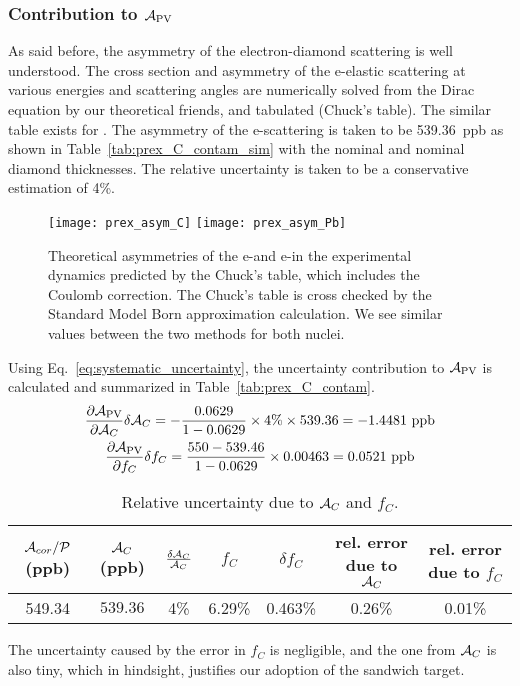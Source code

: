 \subsubsection{Contribution to $\mathcal{A}_{\text{PV}}$}
As said before, the asymmetry of the electron-diamond scattering is well understood.
The cross section and asymmetry of the e-\C elastic scattering at various energies 
and scattering angles are numerically solved from the Dirac equation by our 
theoretical friends, and tabulated (Chuck's table). The similar table exists for \Pb.
The asymmetry of the e-\C scattering is taken to be 539.36~ppb as shown in 
Table~\ref{tab:prex_C_contam_sim}
with the nominal \Pb and nominal diamond thicknesses. The relative uncertainty is taken
to be a conservative estimation of 4\%.
\begin{figure}[!h]
    \centering
    \texttt{[image: prex\_asym\_C]}
    \texttt{[image: prex\_asym\_Pb]}
    \caption{Theoretical asymmetries of the e-\C and e-\Pb in the experimental 
    dynamics predicted by the Chuck's table, which includes the Coulomb correction. 
    The Chuck's table is cross checked by the Standard Model Born approximation 
    calculation. We see similar values between the two methods for both nuclei.}
    \label{prex_asym}
\end{figure}

Using Eq.~\ref{eq:systematic_uncertainty}, the uncertainty contribution to $\mathcal{A}_{\text{PV}}$
is calculated and summarized in Table~\ref{tab:prex_C_contam}.
\begin{equation}
    \begin{gathered}
	\frac{\partial \mathcal{A}_{\text{PV}}}{\partial \mathcal{A}_C} \delta \mathcal{A}_C = 
	-\frac{0.0629}{1 - 0.0629} \times 4\% \times 539.36 = -1.4481\ \mathrm{ppb}   \\
	\frac{\partial \mathcal{A}_{\text{PV}}}{\partial f_C}\delta f_C =
	\frac{550 - 539.46}{1 - 0.0629} \times 0.00463 = 0.0521\ \mathrm{ppb}	\\
    \end{gathered}
\end{equation}

\begin{table}[!h]
    \centering
    \begin{tabular}{c | c c | c c | c c}
        \hline
	\thead{$\mathcal{A}_{cor}/\mathcal{P}$ \\ (ppb)}   & \thead{$\mathcal{A}_C$ \\ (ppb)}   & $\frac{\delta\mathcal{A}_C}{\mathcal{A}_C}$   & $f_C$ & $\delta f_C$  & \thead{rel. error \\ due to $\mathcal{A}_C$ } & \thead{rel. error \\ due to $f_C$}\\
        \hline
	549.34	& $539.36$  & 4\%   & 6.29\%	& 0.463\%   & 0.26\%	& 0.01\% \\
        \hline
    \end{tabular}
    \caption{Relative uncertainty due to $\mathcal{A}_C$ and $f_C$.}
    \label{tab:prex_C_contan}
\end{table}
The uncertainty caused by the error in $f_C$ is negligible, and the one from $\mathcal{A}_C$
is also tiny, which in hindsight, justifies our adoption of the sandwich target.

